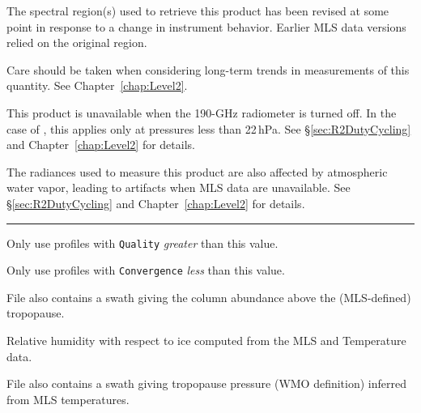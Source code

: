 \begin{table}
{    \begin{tablenotes}
      \item[R] The spectral region(s) used to retrieve this product has been revised at some point in response to a change in instrument behavior. Earlier MLS data versions relied on the original region.
      \item[T] Care should be taken when considering long-term trends in measurements of this quantity. See Chapter~\ref{chap:Level2}.
      \item[U] This product is unavailable when the \mbox{190-GHz} radiometer is turned off. In the case of , this applies only at pressures less than 22\,hPa. See \S\ref{sec:R2DutyCycling} and Chapter~\ref{chap:Level2} for details. 
      \item[W] The radiances used to measure this product are also affected by atmospheric water vapor, leading to artifacts when MLS  data are unavailable. See \S\ref{sec:R2DutyCycling} and Chapter~\ref{chap:Level2} for details.
    \end{tablenotes}
    \vspace{-1ex}\rule{\linewidth}{0.5pt}\par
    \vspace{-0.5ex}\begin{tablenotes}
      \item[\mbox{[1]}] Only use profiles with \texttt{Quality} \emph{greater}
      than this value.
      \item[\mbox{[2]}] Only use profiles with \texttt{Convergence} \emph{less} than this value.
      \item[\mbox{[3]}] File also contains a swath giving the column
      abundance above the (MLS-defined) tropopause.
      \item[\mbox{[4]}] Relative humidity with respect to ice computed from the
      MLS  and Temperature data.
      \item[\mbox{[5]}] File also contains a swath giving tropopause
      pressure (WMO definition) inferred from MLS temperatures.
    \end{tablenotes}}
\end{table}
